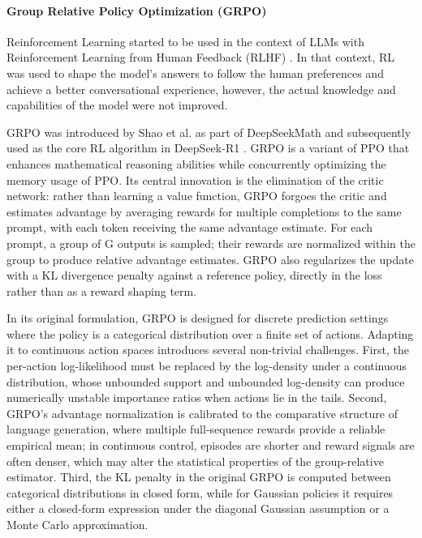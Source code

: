 \documentclass{article}
\begin{document}
\paragraph{Group Relative Policy Optimization (GRPO)}
Reinforcement Learning started to be used in the context of LLMs with Reinforcement Learning from Human Feedback (RLHF) \cite{ouyang2022training}. In that context, RL was used to shape the model's answers to follow the human preferences and achieve a better conversational experience, however, the actual knowledge and capabilities of the model were not improved.

GRPO was introduced by Shao et al. \cite{shao2024deepseekmath} as part of DeepSeekMath and subsequently used as the core RL algorithm in DeepSeek-R1 \cite{guo2025deepseek}. GRPO is a variant of PPO that enhances mathematical reasoning abilities while concurrently optimizing the memory usage of PPO. Its central innovation is the elimination of the critic network: rather than learning a value function, GRPO forgoes the critic and estimates advantage by averaging rewards for multiple completions to the same prompt, with each token receiving the same advantage estimate. For each prompt, a group of G outputs is sampled; their rewards are normalized within the group to produce relative advantage estimates. GRPO also regularizes the update with a KL divergence penalty against a reference policy, directly in the loss rather than as a reward shaping term.

In its original formulation, GRPO is designed for discrete prediction settings where the policy is a categorical distribution over a finite set of actions. Adapting it to continuous action spaces introduces several non-trivial challenges. First, the per-action log-likelihood must be replaced by the log-density under a continuous distribution, whose unbounded support and unbounded log-density can produce numerically unstable importance ratios when actions lie in the tails. Second, GRPO's advantage normalization is calibrated to the comparative structure of language generation, where multiple full-sequence rewards provide a reliable empirical mean; in continuous control, episodes are shorter and reward signals are often denser, which may alter the statistical properties of the group-relative estimator. Third, the KL penalty in the original GRPO is computed between categorical distributions in closed form, while for Gaussian policies it requires either a closed-form expression under the diagonal Gaussian assumption or a Monte Carlo approximation.
\end{document}
